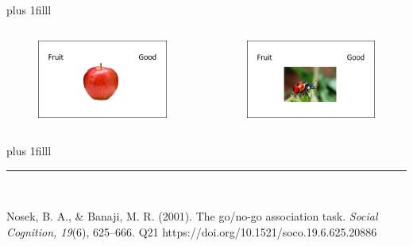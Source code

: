 \documentclass[compress]{beamer}
\begin{document}
	\begin{frame}
		\vskip0pt plus 1filll
		
		\begin{columns}
			\centering{\large{\textbf{\textcolor{green}{GO}}}}
			\begin{figure}
				\includegraphics[width=\linewidth]{go.png}
			\end{figure}
			
			\centering{\large{\textbf{\textcolor{unipd}{NO GO}}}}
			\begin{figure}
				\includegraphics[width=\linewidth]{nogo.png}
			\end{figure}
		\end{columns}
	
	\vskip0pt plus 1filll
	
	
	\color{template}\rule{0.30\linewidth}{0.5pt}\\
	\color{black}
	
	\scriptsize{Nosek, B. A., \& Banaji, M. R. (2001). The go/no-go
		association task. \emph{Social Cognition, 19}(6), 625–666.
		Q21 https://doi.org/10.1521/soco.19.6.625.20886}
\end{frame}
\end{document}
